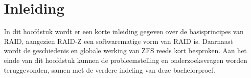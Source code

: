 
\chapter{Inleiding}
\label{ch:inleiding}







In dit hoofdstuk wordt er een korte inleiding gegeven over de basisprincipes van RAID, aangezien RAID-Z een softwarematige vorm van RAID is. Daarnaast wordt de geschiedenis en globale werking van ZFS reeds kort besproken. Aan het einde van dit hoofdstuk kunnen de probleemstelling en onderzoeksvragen worden teruggevonden, samen met de verdere indeling van deze bachelorproef.


